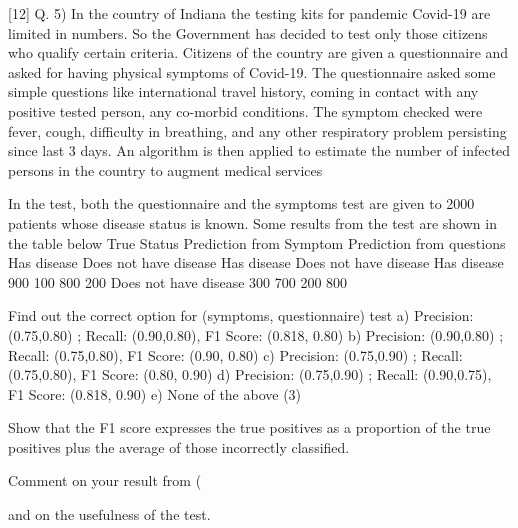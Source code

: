 \documentclass[a4paper,12pt]{article}
\begin{document}
[12]
Q. 5) In the country of Indiana the testing kits for pandemic Covid-19 are limited in numbers.
So the Government has decided to test only those citizens who qualify certain criteria.
Citizens of the country are given a questionnaire and asked for having physical symptoms
of Covid-19. The questionnaire asked some simple questions like international travel
history, coming in contact with any positive tested person, any co-morbid conditions. The
symptom checked were fever, cough, difficulty in breathing, and any other respiratory
problem persisting since last 3 days. An algorithm is then applied to estimate the number
of infected persons in the country to augment medical services

In the test, both the questionnaire and the symptoms test are given to 2000 patients whose
disease status is known. Some results from the test are shown in the table below
True Status
Prediction from Symptom Prediction from questions
Has
disease
Does not
have disease
Has disease
Does not have
disease
Has disease 900 100 800 200
Does not have disease 300 700 200 800

\item  Find out the correct option for (symptoms, questionnaire) test
a) Precision: (0.75,0.80) ; Recall: (0.90,0.80), F1 Score: (0.818, 0.80)
b) Precision: (0.90,0.80) ; Recall: (0.75,0.80), F1 Score: (0.90, 0.80)
c) Precision: (0.75,0.90) ; Recall: (0.75,0.80), F1 Score: (0.80, 0.90)
d) Precision: (0.75,0.90) ; Recall: (0.90,0.75), F1 Score: (0.818, 0.90)
e) None of the above
(3)
\item   Show that the F1 score expresses the true positives as a proportion of the true
positives plus the average of those incorrectly classified. 
\item    Comment on your result from (\item  and on the usefulness of the test. 

\end{document}
